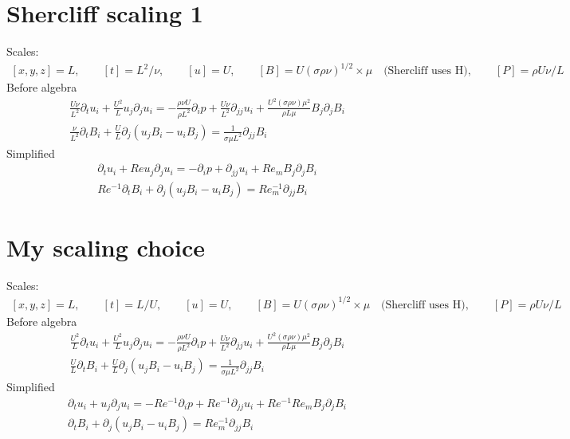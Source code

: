 \documentclass[11pt]{article}
\newcommand{\PD}{\partial}
\begin{document}
\section{Shercliff scaling 1}
Scales:
\begin{equation}\begin{aligned}
	[x,y,z] = L, \qquad
	[t] = L^2 / \nu, \qquad
	[u] = U, \qquad
	[B] = U (\sigma \rho \nu)^{1/2} \times \mu \quad \text{(Shercliff uses H)}, \qquad
	[P] = \rho U \nu / L
\end{aligned} \end{equation}
Before algebra
\begin{equation}\begin{aligned}
\frac{U \nu}{L^2} \PD_t u_i+ \frac{U^2}{L} u_j\PD_j u_i =-\frac{\rho \nu U}{\rho L^2}\PD_i p+ \frac{U \nu}{L^2} \PD_{jj} u_i + \frac{U^2 (\sigma \rho \nu) \mu^2}{\rho L \mu} B_j \PD_j B_i \\
\frac{\nu}{L^2} \PD_t B_i + \frac{U}{L} \PD_j (u_j B_i - u_i B_j) = \frac{1}{\sigma \mu L^2} \PD_{jj} B_i
\end{aligned} \end{equation}
Simplified
\begin{equation}\begin{aligned}
\PD_t u_i+ Re u_j\PD_j u_i =-\PD_i p+ \PD_{jj} u_i + Re_m B_j \PD_j B_i \\
Re^{-1} \PD_t B_i + \PD_j (u_j B_i - u_i B_j) = Re_m^{-1} \PD_{jj} B_i
\end{aligned} \end{equation}

\section{My scaling choice}
Scales:
\begin{equation}\begin{aligned}
	[x,y,z] = L, \qquad
	[t] = L / U, \qquad
	[u] = U, \qquad
	[B] = U (\sigma \rho \nu)^{1/2} \times \mu \quad \text{(Shercliff uses H)}, \qquad
	[P] = \rho U \nu / L
\end{aligned} \end{equation}
Before algebra
\begin{equation}\begin{aligned}
\frac{U^2}{L} \PD_t u_i+ \frac{U^2}{L} u_j\PD_j u_i =-\frac{\rho \nu U}{\rho L^2}\PD_i p+ \frac{U \nu}{L^2} \PD_{jj} u_i + \frac{U^2 (\sigma \rho \nu) \mu^2}{\rho L \mu} B_j \PD_j B_i \\
\frac{U}{L} \PD_t B_i + \frac{U}{L} \PD_j (u_j B_i - u_i B_j) = \frac{1}{\sigma \mu L^2} \PD_{jj} B_i
\end{aligned} \end{equation}
Simplified
\begin{equation}\begin{aligned}
\PD_t u_i + u_j \PD_j u_i = -Re^{-1}\PD_i p + Re^{-1} \PD_{jj} u_i + Re^{-1} Re_m B_j \PD_j B_i \\
\PD_t B_i + \PD_j (u_j B_i - u_i B_j) = Re_m^{-1} \PD_{jj} B_i
\end{aligned} \end{equation}
\end{document}
